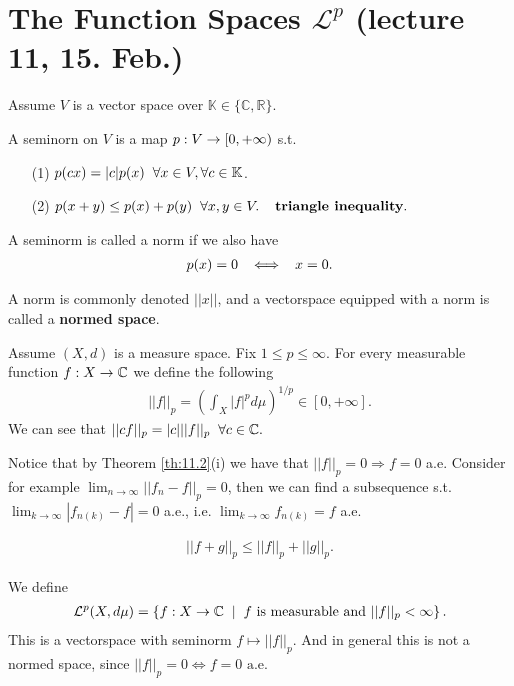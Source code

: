 \section{The Function Spaces $\mathcal{L}^p$ (lecture 11, 15. Feb.)}
Assume $V$ is a vector space over $\mathbb K\in\{\mathbb C,\mathbb R\}$.

\begin{definition}
    A seminorn on $V$ is a map $p:V\rightarrow [0,+\infty)$ s.t. 
    \begin{itemize}
        \item[(1)] $p(cx)=|c|p(x)\hspace{2mm} \forall x\in V,\forall c\in \mathbb K$.
        \item[(2)] $p(x+y)\leq p(x) +p(y)\hspace{2mm} \forall x,y\in V. \hspace{4mm} \textbf{triangle inequality}. $
    \end{itemize}
    A seminorm is called a norm if we also have \begin{align*}
        p(x)=0\hspace{2mm} \iff \hspace{2mm} x=0.
    \end{align*}
\end{definition}

A norm is commonly denoted $||x||$, and a vectorspace equipped with a norm is called a \textbf{normed space}.


\begin{definition}
    Assume $(X,d)$ is a measure space. Fix $1\leq p\leq \infty.$ For every measurable function $f:X\rightarrow \mathbb{C}$ we define the following
    \begin{align}
        ||f||_p = \left( \int_X |f|^p d\mu\right)^{1/p}\in [0,+\infty].
    \end{align} 
    We can see that $||cf||_p=|c|||f||_p\hspace{2mm} \forall c\in\mathbb{C}.$ 
    
    Notice that by Theorem \ref{th:11.2}(i) we have that \(||f||_p=0\Rightarrow 
    f=0\) a.e. Consider for example \(\lim_{n\rightarrow\infty}||f_n-f||_p=0\), then we can find a subsequence s.t. 
    \(\lim_{k\rightarrow\infty}|f_{n(k)}-f|=0\) a.e., i.e.
    \(\lim_{k\rightarrow\infty}f_{n(k)} = f\) a.e. 
\end{definition}

\begin{lemma}
    \begin{align}
        ||f+g||_p\leq ||f||_p+||g||_p.
    \end{align}
\end{lemma}

\begin{definition}
    We define
    \begin{align*}
        \mathcal L^p(X,d\mu) = \left\{ f:X\rightarrow \mathbb{C}\hspace{2mm} |\hspace{2mm} f\text{ is measurable and } ||f||_p<\infty \right\}. 
    \end{align*}
    This is a vectorspace with seminorm $f\mapsto ||f||_p.$
     And in general this is not a normed space, since $||f||_p=0 \iff f=0 \text{ a.e.}$
\end{definition}


